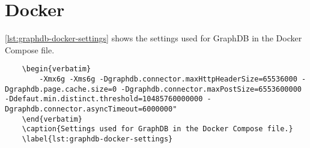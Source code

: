 \chapter{Docker}\label{cha:docker}
\autoref{lst:graphdb-docker-settings} shows the settings used for GraphDB in the Docker Compose file.

\begin{lstlisting}
    \begin{verbatim}
        -Xmx6g -Xms6g -Dgraphdb.connector.maxHttpHeaderSize=65536000 -Dgraphdb.page.cache.size=0 -Dgraphdb.connector.maxPostSize=6553600000 -Ddefaut.min.distinct.threshold=10485760000000 -Dgraphdb.connector.asyncTimeout=6000000"        
    \end{verbatim}
    \caption{Settings used for GraphDB in the Docker Compose file.}
    \label{lst:graphdb-docker-settings}
\end{lstlisting}
